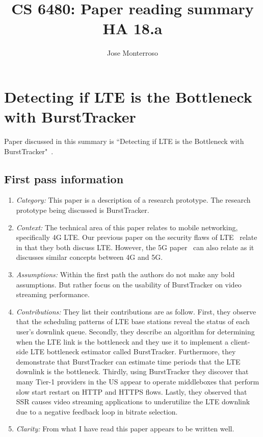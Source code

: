 \documentclass[letterpaper,twocolumn,10pt]{article}
\title{CS 6480: Paper reading summary\\
HA 18.a\\}
\author{Jose Monterroso}
\affil{School of Computing, University of Utah}
\begin{document}
\maketitle
\section{Detecting if LTE is the Bottleneck with BurstTracker}

Paper discussed in this summary is ``Detecting if LTE is the Bottleneck with BurstTracker"~\cite{detectinglte}.

\subsection{First pass information}
\label{sec:first}

\begin{enumerate}

\item {\it Category:} 
This paper is a description of a research prototype. The research prototype being discussed is BurstTracker. 

\item {\it Context:} 
The technical area of this paper relates to mobile networking, specifically 4G LTE. Our previous paper 
on the security flaws of LTE~\cite{breakinglte} relate in that they both discuss LTE. However, the 5G 
paper~\cite{5gwhite} can also relate as it discusses similar concepts between 4G and 5G. 

\item {\it Assumptions:} 
Within the first path the authors do not make any bold assumptions. But rather focus on the usability of 
BurstTracker on video streaming performance.

\item {\it Contributions:} 
They list their contributions are as follow. First, they observe that the scheduling patterns of LTE base 
stations reveal the status of each user's downlink queue. Secondly, they describe an algorithm 
for determining when the LTE link is the bottleneck and they use it to implement a client-side LTE 
bottleneck estimator called BurstTracker. Furthermore, they demonstrate that BurstTracker can 
estimate time periods that the LTE downlink is the bottleneck. Thirdly, using BurstTracker they 
discover that many Tier-1 providers in the US appear to operate middleboxes that perform slow
start restart on HTTP and HTTPS flows. Lastly, they observed that SSR causes video streaming
applications to underutilize the LTE downlink due to a negative feedback loop in bitrate selection. 

\item {\it Clarity:} 
From what I have read this paper appears to be written well. 

\end{enumerate}
\end{document}
